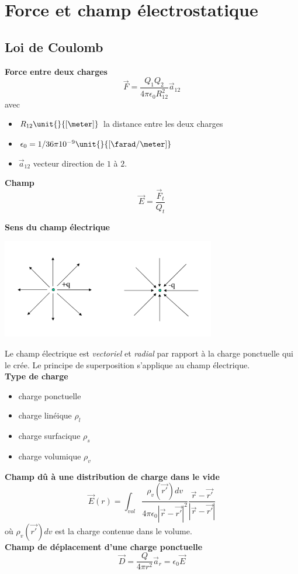
 \chapter{Force et champ électrostatique}
 \section{Loi de Coulomb}
 \textbf{Force entre deux charges} $$\vec{F} = \frac{Q_1Q_2}{4\pi\epsilon_0R_{12}^2} \vec{a}_{12}$$
 avec
 \begin{itemize}
  \item $R_{12} \unit{}{\left[\meter \right]}$ la distance entre les deux charges
  \item $\epsilon_0 = 1/36\pi 10^{-9} \unit{}{\left[ \farad/\meter\right]}$
  \item $\vec{a}_{12}$ vecteur direction de $1$ à $2$.
 \end{itemize}
 \textbf{Champ} $$\vec{E} = \frac{\vec{F}_t}{Q_t}$$
 
 \textbf{Sens du champ électrique}
 \begin{center}
  \includegraphics[width=0.7\textwidth]{SensChampE}
 \end{center}
 Le champ électrique est \emph{vectoriel} et \emph{radial} par rapport à la charge ponctuelle qui le crée. Le principe de superposition s'applique au champ électrique.\\
 \textbf{Type de charge}
 \begin{itemize}
  \item charge ponctuelle
  \item charge linéique $\rho_l$
  \item charge surfacique $\rho_s$
  \item charge volumique $\rho_v$
 \end{itemize}
 \textbf{Champ dû à une distribution de charge dans le vide}
 $$\vec{E}(r)= \int_{vol}{\frac{\rho_v(\vec{r'})dv}{4\pi\epsilon_0 |\vec{r} - \vec{r'}|^2}\frac{\vec{r}-\vec{r'}}{|\vec{r}-\vec{r'}|}}$$
 où $\rho_v(\vec{r'})dv$ est la charge contenue dans le volume.\\
 \textbf{Champ de déplacement d'une charge ponctuelle}
 $$\vec{D} = \frac{Q}{4\pi r^2}\vec{a}_{r} = \epsilon_0 \vec{E}$$
